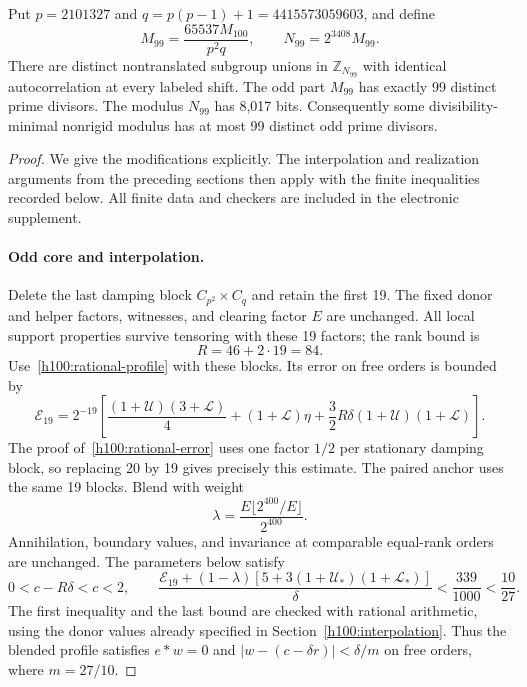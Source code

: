 \begin{theorem}
\label{v2:thm:h99}
Put $p=2101327$ and $q=p(p-1)+1=4415573059603$, and define
\[
 M_{99}=\frac{65537M_{100}}{p^2q},\qquad N_{99}=2^{3408}M_{99}.
\]
There are distinct nontranslated subgroup unions in $\mathbb Z_{N_{99}}$ with identical autocorrelation at every labeled shift. The odd part $M_{99}$ has exactly 99 distinct prime divisors. The modulus $N_{99}$ has 8,017 bits. Consequently some divisibility-minimal nonrigid modulus has at most 99 distinct odd prime divisors.
\end{theorem}
\begin{proof}
We give the modifications explicitly. The interpolation and realization arguments from the preceding sections then apply with the finite inequalities recorded below. All finite data and checkers are included in the electronic supplement.

\paragraph{Odd core and interpolation.}
Delete the last damping block $C_{p^2}\times C_q$ and retain the first 19. The fixed donor and helper factors, witnesses, and clearing factor $E$ are unchanged. All local support properties survive tensoring with these 19 factors; the rank bound is
\[
 R=46+2\cdot19=84.
\]
Use~\eqref{h100:rational-profile} with these blocks. Its error on free orders is bounded by
\begin{equation}\label{v2:eq:h99-error}
 \mathcal E_{19}=2^{-19}\left[
 \frac{(1+\mathcal U)(3+\mathcal L)}4+(1+\mathcal L)\eta
 +\frac32R\delta(1+\mathcal U)(1+\mathcal L)\right].
\end{equation}
The proof of~\eqref{h100:rational-error} uses one factor $1/2$ per stationary damping block, so replacing 20 by 19 gives precisely this estimate. The paired anchor uses the same 19 blocks. Blend with weight
\[
 \lambda=\frac{E\lfloor2^{400}/E\rfloor}{2^{400}}.
\]
Annihilation, boundary values, and invariance at comparable equal-rank orders are unchanged. The parameters below satisfy
\begin{equation}\label{v2:eq:h99-error-check}
 0<c-R\delta<c<2,\qquad
 \frac{\mathcal E_{19}+(1-\lambda)
 [5+3(1+\mathcal U_*)(1+\mathcal L_*)]}{\delta}
 <\frac{339}{1000}<\frac{10}{27}.
\end{equation}
The first inequality and the last bound are checked with rational arithmetic, using the donor values already specified in Section~\ref{h100:interpolation}. Thus the blended profile satisfies $e*w=0$ and
$|w-(c-\delta r)|<\delta/m$ on free orders, where $m=27/10$.


\end{proof}
